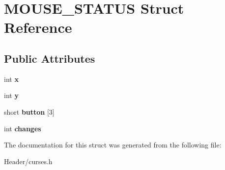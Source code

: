 \hypertarget{structMOUSE__STATUS}{}\section{M\+O\+U\+S\+E\+\_\+\+S\+T\+A\+T\+US Struct Reference}
\label{structMOUSE__STATUS}
\subsection*{Public Attributes}
\begin{DoxyCompactItemize}
\item 
\mbox{\label{structMOUSE__STATUS_aa0f3e47428079f443ae6bd644787f0de}} 
int {\bfseries x}
\item 
\mbox{\label{structMOUSE__STATUS_a53dc64a9228ccaa215c2caba602c03bb}} 
int {\bfseries y}
\item 
\mbox{\label{structMOUSE__STATUS_a246c5a7032024029b454e04a1cab7f0a}} 
short {\bfseries button} \mbox{[}3\mbox{]}
\item 
\mbox{\label{structMOUSE__STATUS_afb3648ee1ef20782b155ae561697964c}} 
int {\bfseries changes}
\end{DoxyCompactItemize}


The documentation for this struct was generated from the following file\+:\begin{DoxyCompactItemize}
\item 
Header/curses.\+h\end{DoxyCompactItemize}
